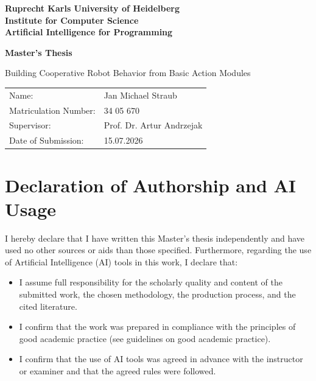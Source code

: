 \documentclass[
     12pt,
     a4paper,
     BCOR=10mm,
     DIV=14,
     listof=totoc,
     bibliography=totoc,
     parskip,
     twoside,
     headsepline
     ]{scrreprt}
\begin{document}
\begin{titlepage}

	\vspace*{1cm}
	\begin{center}
		\vspace*{1cm}
		\textbf{
			\Large Ruprecht Karls University of Heidelberg\\
			\smallskip
			\Large Institute for Computer Science\\
			\smallskip
			\Large Artificial Intelligence for Programming\\
			\smallskip
		}

		\vspace{3cm}

		\textbf{\large Master's Thesis}

		\vspace{2\baselineskip}
		{\huge
			Building Cooperative Robot Behavior from Basic Action Modules
		}
	\end{center}

	\vfill

	{\large
		\begin{tabular}[l]{ll}
			Name:                 & Jan Michael Straub        \\
			Matriculation Number: & 34 05 670                 \\
			Supervisor:           & Prof. Dr. Artur Andrzejak \\
			Date of Submission:   & 15.07.2026
		\end{tabular}
	}

\end{titlepage}

\onehalfspacing

\thispagestyle{empty}

\vspace*{30pt}

\section*{Declaration of Authorship and AI Usage}

I hereby declare that I have written this Master's thesis independently and have used no other sources or aids than those specified. Furthermore, regarding the use of Artificial Intelligence (AI) tools in this work, I declare that:

\begin{itemize}
	\item I assume full responsibility for the scholarly quality and content of the submitted work, the chosen methodology, the production process, and the cited literature.
	\item I confirm that the work was prepared in compliance with the principles of good academic practice (see guidelines on good academic practice).
	\item I confirm that the use of AI tools was agreed in advance with the instructor or examiner and that the agreed rules were followed.
\end{itemize}
\end{document}
